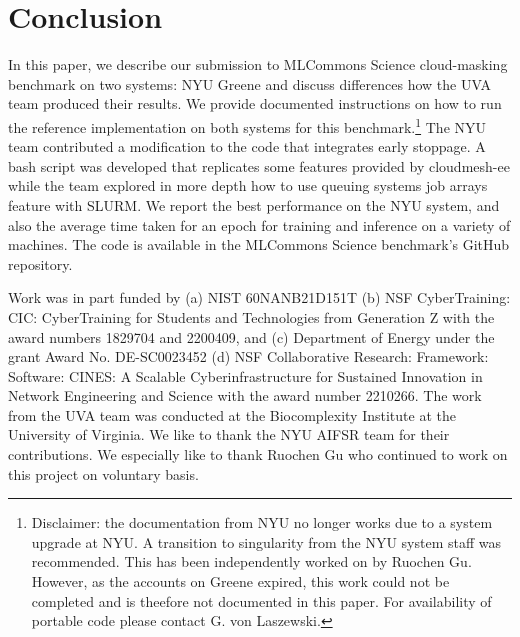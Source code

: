 \documentclass[sigplan,screen]{acmart}
\begin{document}
\section{Conclusion}

In this paper, we describe our submission to MLCommons Science cloud-masking benchmark on two systems: NYU Greene and discuss differences how the UVA team produced their results. We provide documented instructions on how to run the reference implementation on both systems for this benchmark.\footnote{Disclaimer: the documentation from NYU no longer works due to a system upgrade at NYU. A transition to singularity from the NYU system staff was recommended. This has been independently worked on by Ruochen Gu. However, as the accounts on Greene expired, this work could not be completed and is theefore not documented in this paper. For availability of portable code please contact G. von Laszewski.} 
The NYU team contributed a modification to the code that integrates early stoppage. A bash script was developed that replicates some features provided by cloudmesh-ee while the team explored in more depth how to use queuing systems job arrays feature with SLURM. We report the best performance on the NYU system, and also the average time taken for an epoch for training and inference on a variety of machines. The code is available in the MLCommons Science benchmark's GitHub repository.



\begin{acks}

  Work was in part funded by (a) NIST 60NANB21D151T (b) NSF
  CyberTraining: CIC: CyberTraining for Students and Technologies from
  Generation Z with the award numbers 1829704 and 2200409, and (c)
  Department of Energy under the grant Award No. DE-SC0023452 (d) NSF
  Collaborative Research: Framework: Software: CINES: A Scalable
  Cyberinfrastructure for Sustained Innovation in Network Engineering
  and Science with the award number 2210266. The work from the UVA
  team was conducted at the Biocomplexity Institute at
  the University of Virginia.  We like to thank the NYU AIFSR team for
  their contributions. We especially like to thank Ruochen Gu who
  continued to work on this project on voluntary basis.

\end{acks}



\end{document}
